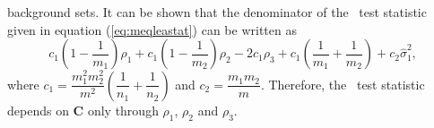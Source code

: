 	background sets. It can be shown that the denominator of the \OurMethod~test statistic given in 
	equation (\ref{eq:meqleastat}) can be written as
	\begin{equation}\label{eq:stat_denom1}
	c_1(1-\dfrac{1}{m_1})\rho_1 + c_1(1-\dfrac{1}{m_2})\rho_2 - 2c_1\rho_3 + 
	c_1(\dfrac{1}{m_1}+\dfrac{1}{m_2})+c_2\hat\sigma_1^2,
	\end{equation}
	where $c_1=\dfrac{m_1^2m_2^2}{m^2}(\dfrac{1}{n_1}+\dfrac{1}{n_2})$ and $c_2=\dfrac{m_1m_2}{m}$. 
	Therefore, the \OurMethod~test statistic depends on $\bm C$ only through $\rho_1$, $\rho_2$ and 
	$\rho_3$. 
	

